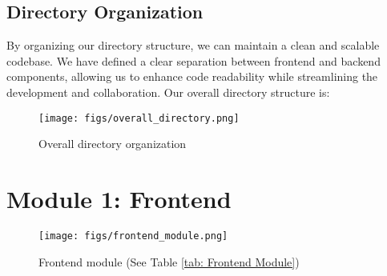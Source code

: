 \documentclass[conference]{IEEEtran}
\begin{document}
\subsection{Directory Organization}
By organizing our directory structure, we can maintain a clean and scalable codebase. We have defined a clear separation between frontend and backend components, allowing us to enhance code readability while streamlining the development and collaboration. Our overall directory structure is:
    \begin{figure}[H]
    \centering
    \texttt{[image: figs/overall\_directory.png]}
    \caption{Overall directory organization}
    \label{fig:Overall directory organization}
    \end{figure}
\section*{Module 1: Frontend}
    \begin{figure}[H]
    \centering
    \texttt{[image: figs/frontend\_module.png]}
    \caption{Frontend module (See Table \ref{tab: Frontend Module})}
    \label{fig:Frontend module}
    \end{figure}
\end{document}

